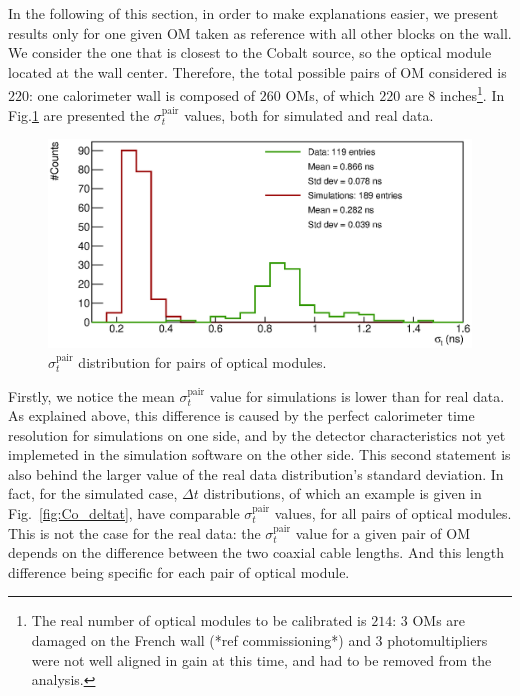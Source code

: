 In the following of this section, in order to make explanations easier, we present results only for one given OM taken as reference with all other blocks on the wall.
We consider the one that is closest to the Cobalt source, so the optical module located at the wall center.
Therefore, the total possible pairs of OM considered is $220$: one calorimeter wall is composed of $260$ OMs, of which $220$ are $8$ inches\footnote{The real number of optical modules to be calibrated is $214$: $3$ OMs are damaged on the French wall (*ref commissioning*) and $3$ photomultipliers were not well aligned in gain at this time, and had to be removed from the analysis.}.
In Fig.\ref{fig:Co_corr_sigma} are presented the $\sigma_{t}^{\text{pair}}$ values, both for simulated and real data.
\begin{figure}[h]
  \centering
  \includegraphics[width=15cm]{commissioning/fig_commissioning/Co_corr_sigma.eps}
  \caption{$\sigma_{t}^{\text{pair}}$ distribution for pairs of optical modules.
    \label{fig:Co_corr_sigma}}
\end{figure}
Firstly, we notice the mean $\sigma_{t}^{\text{pair}}$ value for simulations is lower than for real data.
As explained above, this difference is caused by the perfect calorimeter time resolution for simulations on one side, and by the detector characteristics not yet implemeted in the simulation software on the other side.
This second statement is also behind the larger value of the real data distribution's standard deviation.
In fact, for the simulated case, $\Delta{t}$ distributions, of which an example is given in Fig.~\ref{fig:Co_deltat}, have comparable $\sigma_{t}^{\text{pair}}$ values, for all pairs of optical modules.
This is not the case for the real data: the $\sigma_{t}^{\text{pair}}$ value for a given pair of OM depends on the difference between the two coaxial cable lengths.
And this length difference being specific for each pair of optical module.

